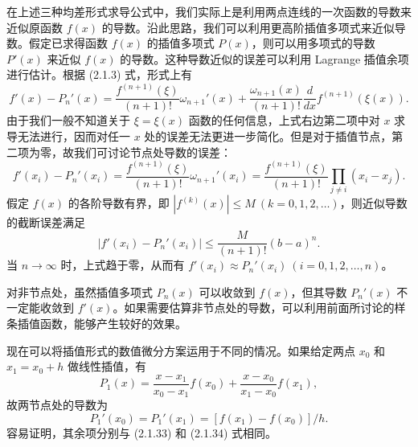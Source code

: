 在上述三种均差形式求导公式中，我们实际上是利用两点连线的一次函数的导数来近似原函数 $f(x)$ 的导数。沿此思路，我们可以利用更高阶插值多项式来近似导数。假定已求得函数 $f(x)$ 的插值多项式 $P(x)$，则可以用多项式的导数 $P'(x)$ 来近似 $f(x)$ 的导数。这种导数近似的误差可以利用 Lagrange 插值余项进行估计。根据 (2.1.3) 式，形式上有
\[
f'(x)-P_n'(x)=\frac{f^{(n+1)}(\xi)}{(n+1)!}\omega_{n+1}'(x)
+\frac{\omega_{n+1}(x)}{(n+1)!}\frac{d}{dx}f^{(n+1)}(\xi(x)).
\]
由于我们一般不知道关于 $\xi=\xi(x)$ 函数的任何信息，上式右边第二项中对 $x$ 求导无法进行，因而对任一 $x$ 处的误差无法更进一步简化。但是对于插值节点，第二项为零，故我们可讨论节点处导数的误差：
\begin{equation}
f'(x_i)-P_n'(x_i)=\frac{f^{(n+1)}(\xi)}{(n+1)!}\omega_{n+1}'(x_i)
=\frac{f^{(n+1)}(\xi)}{(n+1)!}\prod_{j\ne i}(x_i-x_j).
\tag{2.1.36}
\end{equation}
假定 $f(x)$ 的各阶导数有界，即 $|f^{(k)}(x)|\le M\ (k=0,1,2,\ldots)$，则近似导数的截断误差满足
\begin{equation}
|f'(x_i)-P_n'(x_i)|\le\frac{M}{(n+1)!}(b-a)^n.
\tag{2.1.37}
\end{equation}
当 $n\to\infty$ 时，上式趋于零，从而有 $f'(x_i)\approx P_n'(x_i)\ (i=0,1,2,\ldots,n)$。

对非节点处，虽然插值多项式 $P_n(x)$ 可以收敛到 $f(x)$，但其导数 $P_n'(x)$ 不一定能收敛到 $f'(x)$。如果需要估算非节点处的导数，可以利用前面所讨论的样条插值函数，能够产生较好的效果。

现在可以将插值形式的数值微分方案运用于不同的情况。如果给定两点 $x_0$ 和 $x_1=x_0+h$ 做线性插值，有
\begin{equation}
P_1(x)=\frac{x-x_1}{x_0-x_1}f(x_0)+\frac{x-x_0}{x_1-x_0}f(x_1),
\tag{2.1.38}
\end{equation}
故两节点处的导数为
\begin{equation}
P_1'(x_0)=P_1'(x_1)=[f(x_1)-f(x_0)]/h.
\tag{2.1.39}
\end{equation}
容易证明，其余项分别与 (2.1.33) 和 (2.1.34) 式相同。

